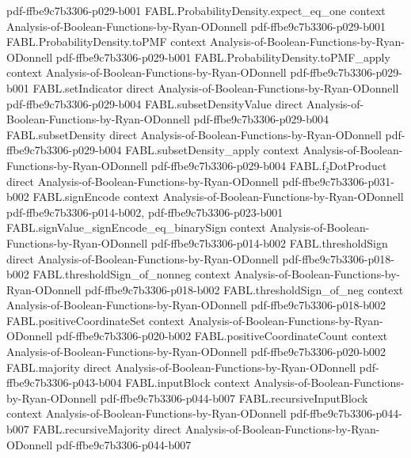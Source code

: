 \begin{theorem}
  {pdf-ffbe9c7b3306-p029-b001}
\proofstep
  {FABL.ProbabilityDensity.expect_eq_one}
  {context}
  {Analysis-of-Boolean-Functions-by-Ryan-ODonnell}
  {pdf-ffbe9c7b3306-p029-b001}
\proofstep
  {FABL.ProbabilityDensity.toPMF}
  {context}
  {Analysis-of-Boolean-Functions-by-Ryan-ODonnell}
  {pdf-ffbe9c7b3306-p029-b001}
\proofstep
  {FABL.ProbabilityDensity.toPMF_apply}
  {context}
  {Analysis-of-Boolean-Functions-by-Ryan-ODonnell}
  {pdf-ffbe9c7b3306-p029-b001}
\proofstep
  {FABL.setIndicator}
  {direct}
  {Analysis-of-Boolean-Functions-by-Ryan-ODonnell}
  {pdf-ffbe9c7b3306-p029-b004}
\proofstep
  {FABL.subsetDensityValue}
  {direct}
  {Analysis-of-Boolean-Functions-by-Ryan-ODonnell}
  {pdf-ffbe9c7b3306-p029-b004}
\proofstep
  {FABL.subsetDensity}
  {direct}
  {Analysis-of-Boolean-Functions-by-Ryan-ODonnell}
  {pdf-ffbe9c7b3306-p029-b004}
\proofstep
  {FABL.subsetDensity_apply}
  {context}
  {Analysis-of-Boolean-Functions-by-Ryan-ODonnell}
  {pdf-ffbe9c7b3306-p029-b004}
\proofstep
  {FABL.f₂DotProduct}
  {direct}
  {Analysis-of-Boolean-Functions-by-Ryan-ODonnell}
  {pdf-ffbe9c7b3306-p031-b002}
\proofstep
  {FABL.signEncode}
  {context}
  {Analysis-of-Boolean-Functions-by-Ryan-ODonnell}
  {pdf-ffbe9c7b3306-p014-b002,
    pdf-ffbe9c7b3306-p023-b001}
\proofstep
  {FABL.signValue_signEncode_eq_binarySign}
  {context}
  {Analysis-of-Boolean-Functions-by-Ryan-ODonnell}
  {pdf-ffbe9c7b3306-p014-b002}
\proofstep
  {FABL.thresholdSign}
  {direct}
  {Analysis-of-Boolean-Functions-by-Ryan-ODonnell}
  {pdf-ffbe9c7b3306-p018-b002}
\proofstep
  {FABL.thresholdSign_of_nonneg}
  {context}
  {Analysis-of-Boolean-Functions-by-Ryan-ODonnell}
  {pdf-ffbe9c7b3306-p018-b002}
\proofstep
  {FABL.thresholdSign_of_neg}
  {context}
  {Analysis-of-Boolean-Functions-by-Ryan-ODonnell}
  {pdf-ffbe9c7b3306-p018-b002}
\proofstep
  {FABL.positiveCoordinateSet}
  {context}
  {Analysis-of-Boolean-Functions-by-Ryan-ODonnell}
  {pdf-ffbe9c7b3306-p020-b002}
\proofstep
  {FABL.positiveCoordinateCount}
  {context}
  {Analysis-of-Boolean-Functions-by-Ryan-ODonnell}
  {pdf-ffbe9c7b3306-p020-b002}
\proofstep
  {FABL.majority}
  {direct}
  {Analysis-of-Boolean-Functions-by-Ryan-ODonnell}
  {pdf-ffbe9c7b3306-p043-b004}
\proofstep
  {FABL.inputBlock}
  {context}
  {Analysis-of-Boolean-Functions-by-Ryan-ODonnell}
  {pdf-ffbe9c7b3306-p044-b007}
\proofstep
  {FABL.recursiveInputBlock}
  {context}
  {Analysis-of-Boolean-Functions-by-Ryan-ODonnell}
  {pdf-ffbe9c7b3306-p044-b007}
\proofstep
  {FABL.recursiveMajority}
  {direct}
  {Analysis-of-Boolean-Functions-by-Ryan-ODonnell}
  {pdf-ffbe9c7b3306-p044-b007}
\proofstep

\end{theorem}
